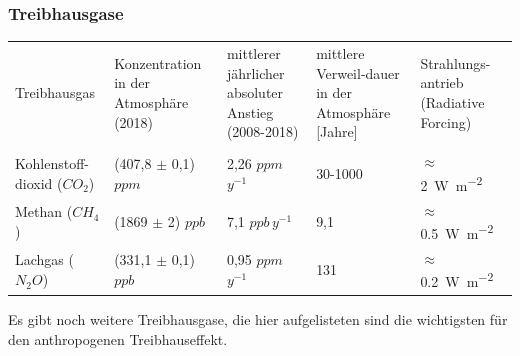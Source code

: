 \begin{frame}
	\frametitle{Treibhausgase} %




	\begin{tabular}{p{2.5cm}|p{3cm}|p{3cm}|p{2cm}|p{2cm}}
		Treibhausgas & Konzentration in der Atmosphäre (2018) & mittlerer jährlicher absoluter Anstieg (2008-2018) & mittlere Verweil-dauer in der Atmosphäre [Jahre] & Strahlungs-antrieb (Radiative Forcing) \\ \\
		\hline
		Kohlenstoff-dioxid ($CO_2$) & (407,8 $\pm$ 0,1) $ppm$ & 2,26 $ppm$\,$y^{-1}$ &  30-1000 & $\approx$ \SI{2}{\watt\per\square\metre} \\
		\hline
		Methan ($CH_4$) & (1869 $\pm$ 2) $ppb$ & 7,1 $ppb$\,$y^{-1}$ &9,1 & $\approx $ \SI{0,5}{\watt\per\square\metre}  \\
		\hline
		Lachgas ($N_2O$) & (331,1 $\pm$ 0,1) $ppb$ & 0,95 $ppm$\,$y^{-1}$ & 131 & $\approx $ \SI{0,2}{\watt\per\square\metre}  \\
	\end{tabular}
	Es gibt noch weitere Treibhausgase, die hier aufgelisteten sind die wichtigsten für den anthropogenen Treibhauseffekt.
\end{frame}

